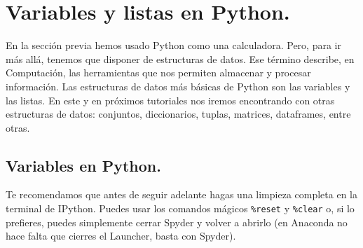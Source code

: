 \documentclass[10pt,a4paper]{article}\usepackage[]{graphicx}\usepackage[]{color}
\newcounter {cont01}
\begin{document}
\section{Variables y listas en Python.}
\label{tut02:sec:variablesListasPython}

En la sección previa hemos usado Python como una calculadora. Pero, para ir más allá, tenemos que disponer de {\sf estructuras de datos}. Ese término describe, en Computación, las herramientas que nos permiten almacenar y procesar información. Las estructuras de datos más básicas de Python son las {\sf variables} y las {\sf listas}. En este y en próximos tutoriales nos iremos encontrando con otras estructuras de datos: conjuntos, diccionarios, tuplas, matrices, dataframes, entre otras.

\subsection{Variables en Python.}
\label{tut02:subsec:variablesPython}

Te recomendamos que antes de seguir adelante hagas una limpieza completa en la terminal de IPython. Puedes usar los comandos mágicos \verb#%reset# y \verb#%clear#  
o, si lo prefieres, puedes simplemente cerrar Spyder y volver a abrirlo (en Anaconda no hace falta que cierres el Launcher, basta con Spyder).
\end{document}

